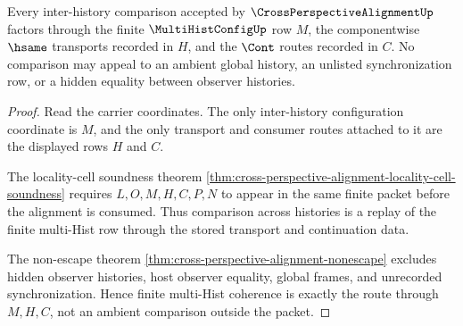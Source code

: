 \begin{theorem}
\label{thm:cross-perspective-alignment-finite-multihist-coherence}
Every inter-history comparison accepted by $\CrossPerspectiveAlignmentUp$ factors through the finite $\MultiHistConfigUp$ row $M$, the componentwise $\hsame$ transports recorded in $H$, and the $\Cont$ routes recorded in $C$. No comparison may appeal to an ambient global history, an unlisted synchronization row, or a hidden equality between observer histories.
\end{theorem}
\begin{proof}
Read the carrier coordinates. The only inter-history configuration coordinate is $M$, and the only transport and consumer routes attached to it are the displayed rows $H$ and $C$.

The locality-cell soundness theorem \autoref{thm:cross-perspective-alignment-locality-cell-soundness} requires $L,O,M,H,C,P,N$ to appear in the same finite packet before the alignment is consumed. Thus comparison across histories is a replay of the finite multi-Hist row through the stored transport and continuation data.

The non-escape theorem \autoref{thm:cross-perspective-alignment-nonescape} excludes hidden observer histories, host observer equality, global frames, and unrecorded synchronization. Hence finite multi-Hist coherence is exactly the route through $M,H,C$, not an ambient comparison outside the packet.
\end{proof}

